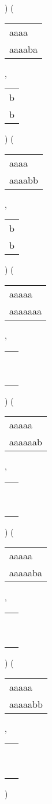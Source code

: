 ) 
 ( 
\begin{tabular}{|l|} \hline
aaaa\ \  \\
aaaaba \\
\hline
\end{tabular} 
 , 
\begin{tabular}{|l|} \hline
b \\
b \\
\hline
\end{tabular} 
) 
 ( 
\begin{tabular}{|l|} \hline
aaaa\ \  \\
aaaabb \\
\hline
\end{tabular} 
 , 
\begin{tabular}{|l|} \hline
b \\
b \\
\hline
\end{tabular} 
) 
 ( 
\begin{tabular}{|l|} \hline
aaaaa\ \  \\
aaaaaaa \\
\hline
\end{tabular} 
 , 
\begin{tabular}{|l|} \hline
\ \\ \ \\ \hline
\end{tabular} 
) 
 ( 
\begin{tabular}{|l|} \hline
aaaaa\ \  \\
aaaaaab \\
\hline
\end{tabular} 
 , 
\begin{tabular}{|l|} \hline
\ \\ \ \\ \hline
\end{tabular} 
) 
 ( 
\begin{tabular}{|l|} \hline
aaaaa\ \  \\
aaaaaba \\
\hline
\end{tabular} 
 , 
\begin{tabular}{|l|} \hline
\ \\ \ \\ \hline
\end{tabular} 
) 
 ( 
\begin{tabular}{|l|} \hline
aaaaa\ \  \\
aaaaabb \\
\hline
\end{tabular} 
 , 
\begin{tabular}{|l|} \hline
\ \\ \ \\ \hline
\end{tabular} 
) 
